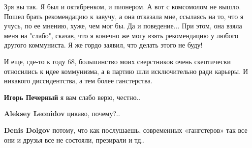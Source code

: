 \begin{itemize}
\begin{itemize}
Зря вы так. Я был и октябренком, и пионером. А вот с комсомолом не вышло. Пошел
брать рекомендацию к завучу, а она отказала мне, ссылаясь на то, что я учусь,
по ее мнению, хуже, чем мог бы. Да и поведение... При этом, она взяла меня на
"слабо", сказав, что я конечно же могу взять рекомендацию у любого другого
коммуниста. Я же гордо заявил, что делать этого не буду!



 

И еще, где-то к году 68, большинство моих сверстников очень скептически
относились к идее коммунизма, а в партию шли исключительно ради карьеры. И
никакого диссидентства, а тем более ганстерства.

\begin{itemize}
 
\textbf{Игорь Печерный} я вам слабо верю, честно..


 
\textbf{Aleksey Leonidov} цикаво, почему?..


 
\textbf{Denis Dolgov} потому, что как послушаешь, современных «гангстеров» так все они и друзья все не состояли, презирали и тд..


 

\end{itemize}
\end{itemize}
\end{itemize}
